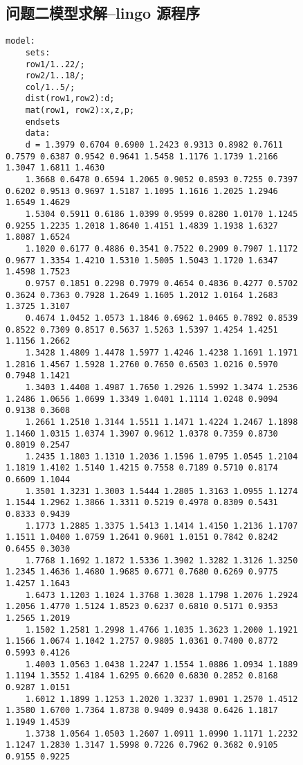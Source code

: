 \documentclass{whutmod}
\begin{document}
\begin{spacing}{1.2}
\begin{figure}[H]
\subsection{问题二模型求解--lingo 源程序}
\begin{lstlisting}[language=lingo]
	model:
	sets:
	row1/1..22/;
	row2/1..18/;
	col/1..5/;
	dist(row1,row2):d;
	mat(row1, row2):x,z,p;
	endsets
	data:
	d = 1.3979 0.6704 0.6900 1.2423 0.9313 0.8982 0.7611 0.7579 0.6387 0.9542 0.9641 1.5458 1.1176 1.1739 1.2166 1.3047 1.6811 1.4630 
	1.3668 0.6478 0.6594 1.2065 0.9052 0.8593 0.7255 0.7397 0.6202 0.9513 0.9697 1.5187 1.1095 1.1616 1.2025 1.2946 1.6549 1.4629 
	1.5304 0.5911 0.6186 1.0399 0.9599 0.8280 1.0170 1.1245 0.9255 1.2235 1.2018 1.8640 1.4151 1.4839 1.1938 1.6327 1.8087 1.6524 
	1.1020 0.6177 0.4886 0.3541 0.7522 0.2909 0.7907 1.1172 0.9677 1.3354 1.4210 1.5310 1.5005 1.5043 1.1720 1.6347 1.4598 1.7523 
	0.9757 0.1851 0.2298 0.7979 0.4654 0.4836 0.4277 0.5702 0.3624 0.7363 0.7928 1.2649 1.1605 1.2012 1.0164 1.2683 1.3725 1.3107 
	0.4674 1.0452 1.0573 1.1846 0.6962 1.0465 0.7892 0.8539 0.8522 0.7309 0.8517 0.5637 1.5263 1.5397 1.4254 1.4251 1.1156 1.2662 
	1.3428 1.4809 1.4478 1.5977 1.4246 1.4238 1.1691 1.1971 1.2816 1.4567 1.5928 1.2760 0.7650 0.6503 1.0216 0.5970 0.7948 1.1421 
	1.3403 1.4408 1.4987 1.7650 1.2926 1.5992 1.3474 1.2536 1.2486 1.0656 1.0699 1.3349 1.0401 1.1114 1.0248 0.9094 0.9138 0.3608 
	1.2661 1.2510 1.3144 1.5511 1.1471 1.4224 1.2467 1.1898 1.1460 1.0315 1.0374 1.3907 0.9612 1.0378 0.7359 0.8730 0.8019 0.2547 
	1.2435 1.1803 1.1310 1.2036 1.1596 1.0795 1.0545 1.2104 1.1819 1.4102 1.5140 1.4215 0.7558 0.7189 0.5710 0.8174 0.6609 1.1044 
	1.3501 1.3231 1.3003 1.5444 1.2805 1.3163 1.0955 1.1274 1.1544 1.2962 1.3866 1.3311 0.5219 0.4978 0.8309 0.5431 0.8333 0.9439 
	1.1773 1.2885 1.3375 1.5413 1.1414 1.4150 1.2136 1.1707 1.1511 1.0400 1.0759 1.2641 0.9601 1.0151 0.7842 0.8242 0.6455 0.3030 
	1.7768 1.1692 1.1872 1.5336 1.3902 1.3282 1.3126 1.3250 1.2345 1.4636 1.4680 1.9685 0.6771 0.7680 0.6269 0.9775 1.4257 1.1643 
	1.6473 1.1203 1.1024 1.3768 1.3028 1.1798 1.2076 1.2924 1.2056 1.4770 1.5124 1.8523 0.6237 0.6810 0.5171 0.9353 1.2565 1.2019 
	1.1502 1.2581 1.2998 1.4766 1.1035 1.3623 1.2000 1.1921 1.1566 1.0674 1.1042 1.2757 0.9805 1.0361 0.7400 0.8772 0.5993 0.4126 
	1.4003 1.0563 1.0438 1.2247 1.1554 1.0886 1.0934 1.1889 1.1194 1.3552 1.4184 1.6295 0.6620 0.6830 0.2852 0.8168 0.9287 1.0151 
	1.6012 1.1899 1.1253 1.2020 1.3237 1.0901 1.2570 1.4512 1.3580 1.6700 1.7364 1.8738 0.9409 0.9438 0.6426 1.1817 1.1949 1.4539 
	1.3738 1.0564 1.0503 1.2607 1.0911 1.0990 1.1171 1.2232 1.1247 1.2830 1.3147 1.5998 0.7226 0.7962 0.3682 0.9105 0.9155 0.9225 

\end{lstlisting}
\end{figure}
\end{spacing}
\end{document}
